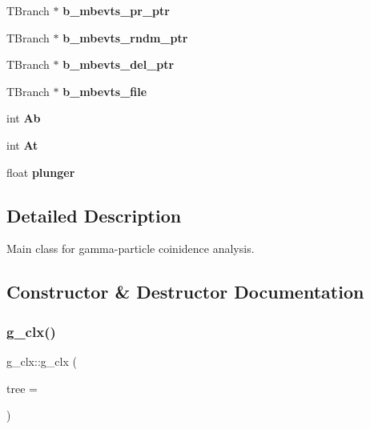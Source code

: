 \begin{DoxyCompactItemize}
T\+Branch $\ast$ {\bfseries b\+\_\+mbevts\+\_\+pr\+\_\+ptr}
\item 
\mbox{\label{classg__clx_a7401209db4725c74c75d38e15a6b2d11}} 
T\+Branch $\ast$ {\bfseries b\+\_\+mbevts\+\_\+rndm\+\_\+ptr}
\item 
\mbox{\label{classg__clx_abb8b9787037a50733cc8f2efb64fadba}} 
T\+Branch $\ast$ {\bfseries b\+\_\+mbevts\+\_\+del\+\_\+ptr}
\item 
\mbox{\label{classg__clx_a59f6b47f4c944b311e6dd5a0abb103c5}} 
T\+Branch $\ast$ {\bfseries b\+\_\+mbevts\+\_\+file}
\item 
\mbox{\label{classg__clx_a3ecad3ddd660369644dafb28e0bfe26d}} 
int {\bfseries Ab}
\item 
\mbox{\label{classg__clx_a357526f9a06f3059124825bbf6c7a790}} 
int {\bfseries At}
\item 
\mbox{\label{classg__clx_aee52e53d2cd780936d648225402d8bcf}} 
float {\bfseries plunger}
\end{DoxyCompactItemize}


\subsection{Detailed Description}
Main class for gamma-\/particle coinidence analysis. 

\subsection{Constructor \& Destructor Documentation}
\mbox{\label{classg__clx_aa619daf508fe1d6bddb000af26630f31}} 
\subsubsection{\texorpdfstring{g\+\_\+clx()}{g\_clx()}}
{\footnotesize\ttfamily g\+\_\+clx\+::g\+\_\+clx (\begin{DoxyParamCaption}\item[{T\+Tree $\ast$}]{tree = {} }\end{DoxyParamCaption})}


